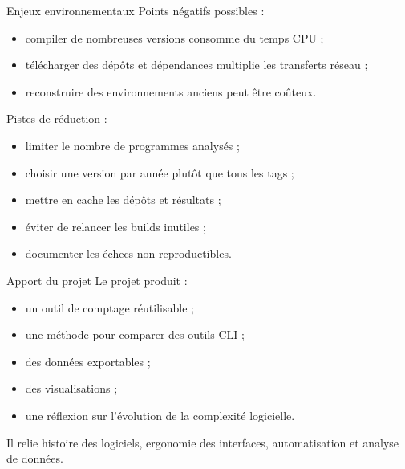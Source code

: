 \documentclass[10pt,aspectratio=169]{beamer}
\begin{document}
\begin{frame}{Enjeux environnementaux}
  Points négatifs possibles :

  \begin{itemize}
    \item compiler de nombreuses versions consomme du temps CPU ;
    \item télécharger des dépôts et dépendances multiplie les transferts réseau ;
    \item reconstruire des environnements anciens peut être coûteux.
  \end{itemize}

  \vspace{0.3cm}
  Pistes de réduction :
  \begin{itemize}
    \item limiter le nombre de programmes analysés ;
    \item choisir une version par année plutôt que tous les tags ;
    \item mettre en cache les dépôts et résultats ;
    \item éviter de relancer les builds inutiles ;
    \item documenter les échecs non reproductibles.
  \end{itemize}
\end{frame}

\begin{frame}{Apport du projet}
  Le projet produit :

  \begin{itemize}
    \item un outil de comptage réutilisable ;
    \item une méthode pour comparer des outils CLI ;
    \item des données exportables ;
    \item des visualisations ;
    \item une réflexion sur l'évolution de la complexité logicielle.
  \end{itemize}

  \vspace{0.3cm}
  Il relie histoire des logiciels, ergonomie des interfaces, automatisation et analyse de données.
\end{frame}
\end{document}
